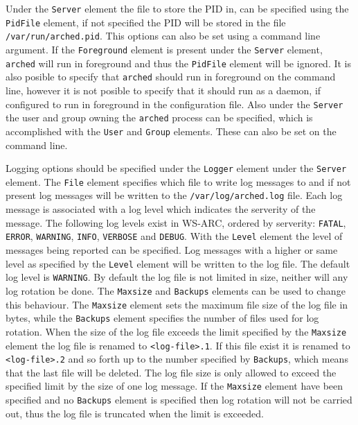 \documentclass{article}
\begin{document}
Under the \texttt{Server} element the file to store the PID in, can be specified
using the \texttt{PidFile} element, if not specified the PID will be stored in
the file \texttt{/var/run/arched.pid}. This options can also be set using a
command line argument. If the \texttt{Foreground} element is
present under the \texttt{Server} element, \texttt{arched} will run in
foreground and thus the \texttt{PidFile} element will be ignored. It is also
posible to specify that \texttt{arched} should run in foreground on the command
line, however it is not posible to specify that it should run as a daemon, if
configured to run in foreground in the configuration file. Also under the
\texttt{Server} the user and group owning the \texttt{arched} process can be
specified, which is accomplished with the \texttt{User} and \texttt{Group}
elements. These can also be set on the command line.

Logging options should be specified under the \texttt{Logger} element under the
\texttt{Server} element. The \texttt{File} element specifies which file to write
log messages to and if not present log messages will be written to the
\texttt{/var/log/arched.log} file. Each log message is associated with a log
level which indicates the serverity of the message. The following log levels
exist in WS-ARC, ordered by serverity: \texttt{FATAL}, \texttt{ERROR},
\texttt{WARNING}, \texttt{INFO}, \texttt{VERBOSE} and \texttt{DEBUG}. With
the \texttt{Level} element the level of messages being reported can be
specified. Log messages with a higher or same level as specified by the
\texttt{Level} element will be written to the log file. The default log level is
\texttt{WARNING}. \newline
By default the log file is not limited in size, neither
will any log rotation be done. The \texttt{Maxsize} and \texttt{Backups}
elements can be used to change this behaviour. The \texttt{Maxsize} element sets
the maximum file size of the log file in bytes, while the \texttt{Backups}
element specifies the number of files used for log rotation. When the size of
the log file exceeds the limit specified by the \texttt{Maxsize} element the log
file is renamed to \texttt{<log-file>.1}. If this file exist it is renamed to
\texttt{<log-file>.2} and so forth up to the number specified by
\texttt{Backups}, which means that the last file will be deleted. The log file
size is only allowed to exceed the specified limit by the size of one log
message. If the \texttt{Maxsize} element have been specified and no
\texttt{Backups} element is specified then log rotation will not be carried out,
thus the log file is truncated when the limit is exceeded.
\end{document}
